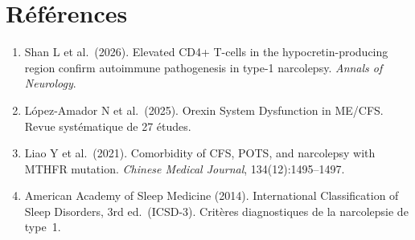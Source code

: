 \documentclass[11pt,a4paper]{article}
\begin{document}
\section{Références}
\label{sec:references}

\begin{enumerate}[nosep]
    \item Shan L et al.\ (2026). Elevated CD4+ T-cells in the hypocretin-producing region confirm autoimmune pathogenesis in type-1 narcolepsy. \textit{Annals of Neurology}.
    \item López-Amador N et al.\ (2025). Orexin System Dysfunction in ME/CFS. Revue systématique de 27 études.
    \item Liao Y et al.\ (2021). Comorbidity of CFS, POTS, and narcolepsy with MTHFR mutation. \textit{Chinese Medical Journal}, 134(12):1495--1497.
    \item American Academy of Sleep Medicine (2014). International Classification of Sleep Disorders, 3rd ed.\ (ICSD-3). Critères diagnostiques de la narcolepsie de type~1.
\end{enumerate}
\end{document}
